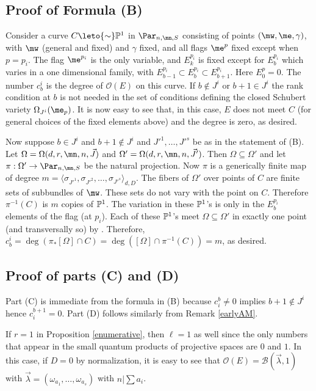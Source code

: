 \subsection{Proof of Formula (B)}
Consider a curve $C\leto{\sim} \Bbb{P}^1$ in $\Par_{n,\mn,S}$ consisting of points $(\mw,\me,\gamma)$, with $\mw$ (general and fixed) and $\gamma$ fixed, and all flags $\me^p$ fixed except when $p=p_i$. The flag $\me^{p_i}$ is the only variable, and $E^{p_i}_k$ is fixed except for $E^{p_i}_{b}$ which varies in a one dimensional family, with $E^{p_i}_{b-1}\subset E^{p_i}_b\subset E^{p_i}_{b+1}$. Here $E^p_0=0$. The number $c^i_b$ is the degree of $\mathcal{O}(E)$ on this curve. If $b\not\in J^i$ or $b+1\in J^i$  the rank condition at $b$ is not needed in the set of conditions defining the closed Schubert variety $\Omega_{J^i}(\me_p)$. It is now easy to see that, in this case, $E$ does not meet $C$ (for general choices of the fixed elements above) and the degree is zero, as desired.

Now suppose $b\in J^i$ and $b+1\not\in J^i$ and $J'^1,\dots,J'^s$ be as in the statement of (B). Let  $\Omega=\Omega(d,r,\mn,n,\vec{J})$ and $\Omega'=\Omega(d,r,\mn,n,\vec{J}')$. Then $\Omega\subseteq \Omega'$ and let $\pi:\Omega'\to \Par_{n,\mn,S}$ be the natural projection. Now $\pi$ is a generically finite map of degree $m=\langle\sigma_{J'^1}, \sigma_{J'^2},\dots,\sigma_{J'^s}\rangle_{d,D}$.  The fibers of $\Omega'$ over points of $C$ are finite sets of subbundles of $\mw$. These sets do not vary with the point on $C$. Therefore $\pi^{-1}(C)$ is $m$ copies of $\Bbb{P}^1$. The variation in these $\Bbb{P}^1$'s is only in the  $E^{p_i}_b$ elements of the flag (at $p_i$). Each of these $\Bbb{P}^1$'s meet $\Omega\subseteq \Omega'$ in exactly one point (and transversally so) by \cite[Lemma 8.8]{BHermit}. Therefore, $c^i_b =\deg(\pi_*[\Omega]\cap C)= \deg([\Omega]\cap \pi^{-1}(C))=m$, as desired.
\subsection{Proof of parts (C) and (D)}
Part (C) is immediate from the formula in (B) because $c_i^b\neq 0$ implies $b+1\notin J^i$ hence
$c_i^{b+1}=0$. Part (D) follows similarly from Remark \ref{earlyAM}.

\begin{remark}
\notready\label{ajabaja}
If $r=1$ in Proposition \ref{enumerative}, then $\ell=1$ as well since the only numbers that appear in the small quantum products of projective spaces are $0$ and $1$. In this case, if $D=0$ by normalization, it is easy to see that $\mathcal{O}(E)=\mathcal{B}(\vec{\lambda},1)$ with $\vec{\lambda}=(\omega_{a_1},\dots,\omega_{a_s})$ with $n|\sum a_i$.
\end{remark}
